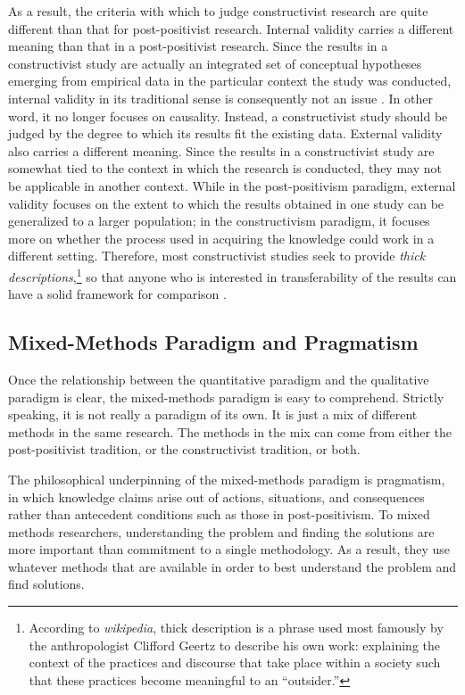 As a result, the criteria with which to judge constructivist research are quite different than that for post-positivist research. 
Internal validity carries a different meaning than that in a post-positivist research. Since the results in a constructivist study are actually an integrated set of conceptual hypotheses emerging from empirical data in the particular context the study was conducted, internal validity in its traditional sense is consequently not an issue \cite{Glaser:1998, Glaser:1967}. In other word, it no longer focuses on causality. Instead, a constructivist study should be judged by the degree to which its results fit the existing data.
External validity also carries a different meaning. Since the results in a constructivist study are somewhat tied to the context in which the research is conducted, they may not be applicable in another context. While in the post-positivism paradigm, external validity focuses on the extent to which the results obtained in one study can be generalized to a larger population; in the constructivism paradigm, it focuses more on whether the process used in acquiring the 
knowledge could work in a different setting. Therefore, most constructivist studies seek to provide \textit{thick descriptions},\footnote{According to \textit{wikipedia}, thick description is a phrase used most famously by the anthropologist Clifford Geertz to describe his own work: explaining the context of the practices and discourse that take place within a society such that these practices become meaningful to an ``outsider.''} so that anyone who is interested in transferability of the results can have a solid framework for comparison \cite{Merriam:1998}.



\subsection{Mixed-Methods Paradigm and Pragmatism}

Once the relationship between the quantitative paradigm and the qualitative paradigm is clear, the mixed-methods paradigm is easy to comprehend. Strictly speaking, it is not really a paradigm of its own. It is just a mix of different methods in the same research. The methods in the mix can come from either the post-positivist tradition, or the constructivist tradition, or both. 

The philosophical underpinning of the mixed-methods paradigm is pragmatism, in which knowledge claims arise out of actions, situations, and consequences rather than antecedent conditions such as those in post-positivism. To mixed methods researchers, understanding the problem and finding the solutions are more important than commitment to a single methodology. As a result, they use whatever methods that are available in order to best understand the problem and find solutions.

